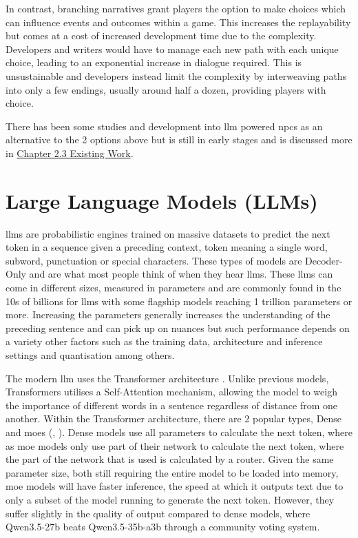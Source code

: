 \documentclass[12pt, a4paper]{report}
\begin{document}
	In contrast, branching narratives grant players the option to make choices which can influence events and outcomes within a game. This increases the replayability but comes at a cost of increased development time due to the complexity. Developers and writers would have to manage each new path with each unique choice, leading to an exponential increase in dialogue required. This is unsustainable and developers instead limit the complexity by interweaving paths into only a few endings, usually around half a dozen, providing  players with choice.
	
	There has been some studies and development into \gls{llm} powered \gls{npc}s as an alternative to the 2 options above but is still in early stages and is discussed more in \hyperref[section:existingwork]{Chapter 2.3 Existing Work}.
	
	\section{Large Language Models (LLMs)}
	\gls{llm}s are probabilistic engines trained on massive datasets to predict the next token in a sequence given a preceding context, token meaning a single word, subword, punctuation or special characters. These types of models are Decoder-Only and are what most people think of when they hear \gls{llm}s. These \gls{llm}s can come in different sizes, measured in parameters and are commonly found in the 10s of billions for \gls{llm}s with some flagship models reaching 1 trillion parameters or more. Increasing the parameters generally increases the understanding of the preceding sentence and can pick up on nuances but such performance depends on a variety other factors such as the training data, architecture and inference settings and quantisation among others.
	
	The modern \gls{llm} uses the Transformer architecture \parencite{vaswani2017attention}. Unlike previous models, Transformers utilises a Self-Attention mechanism, allowing the model to weigh the importance of different words in a sentence regardless of distance from one another. Within the Transformer architecture, there are 2 popular types, Dense and \gls{moe}s (\cite{shazeer2017outrageously}, \cite{kaiser2017one}). Dense models use all parameters to calculate the next token, where as \gls{moe} models only use part of their network to calculate the next token, where the part of the network that is used is calculated by a router. Given the same parameter size, both still requiring the entire model to be loaded into memory, \gls{moe} models will have faster inference, the speed at which it outputs text due to only a subset of the model running to generate the next token. However, they suffer slightly in the quality of output compared to dense models, \cite{arenaLeaderboardBest} where Qwen3.5-27b beats Qwen3.5-35b-a3b through a community voting system.
	
\end{document}
